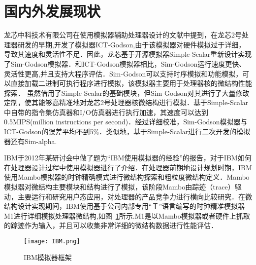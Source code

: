 \section{国内外发展现状}
龙芯中科技术有限公司在使用模拟器辅助处理器设计的文献中提到\cite{zhang2007sim,gao2007simos}，在龙芯2号处理器研发的早期,开发了模拟器ICT-Godson,由于该模拟器对硬件模拟过于详细，导致其速度和灵活性不足．因此，龙芯基于开源模拟器Simple-Scalar\cite{austin2002simplescalar}重新设计实现了Sim-Godson模拟器\cite{zhang2007sim}．和ICT-Godson模拟器相比，Sim-Godson运行速度更快、灵活性更高,并且支持大程序评估\cite{zhang2007sim}．Sim-Godson可以支持时序模拟和功能模拟，可以直接加载二进制可执行程序进行模拟，该模拟器主要用于处理器核的微结构性能探索．
虽然借用了Simple-Scalar的基础模块，但Sim-Godson对其进行了大量修改定制，使其能够高精准地对龙芯2号处理器核微结构进行模拟．基于Simple-Scalar中自带的指令集仿真器和I/O仿真器进行执行加速，其速度可以达到0.5MIPS(million instructions per second)．经过详细校准，Sim-Godson模拟器与ICT-Godson的误差平均不到5\%\cite{zhang2007sim}．类似地，基于Simple-Scalar进行二次开发的模拟器还有Sim-alpha\cite{desikan2001sim}.


IBM于2012年某研讨会中做了题为“IBM使用模拟器的经验”的报告\cite{kistlerexperiences}，对于IBM如何在处理器设计过程中使用模拟器进行了介绍．在处理器前期地设计规划时期，IBM使用Mambo\cite{boh}模拟器的时钟精确模式进行微结构探索和粗粒度微结构定义．Mambo模拟器对微结构主要模块和结构进行了模拟，该阶段Mambo由踪迹（trace）驱动，主要运行和研究用户态应用，对处理器的产品竞争力进行横向比较研究\cite{kistlerexperiences}．在微结构设计实现期间，IBM使用基于公司内部专用“Ｔ”语言编写的时钟精准模拟器M1进行详细模拟处理器微结构\cite{kistlerexperiences},如图~\ref{fig:IBM}所示.M1是以Mambo模拟器或者硬件上抓取的踪迹作为输入，并且可以收集非常详细的微结构数据进行性能评估．
\begin{figure}[h]
  \centering
  \texttt{[image: IBM.png]}
  \caption{IBM模拟器框架}
  \label{fig:IBM}
\end{figure}  


